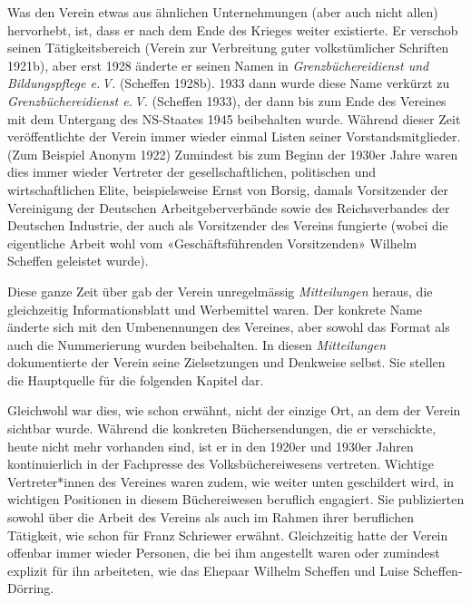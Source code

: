 \documentclass[a4paper,
fontsize=11pt,
oneside,
numbers=noperiodatend,
parskip=half-,
bibliography=totoc,
final
]{scrartcl}
\begin{document}
Was den Verein etwas aus ähnlichen Unternehmungen (aber auch nicht
allen) hervorhebt, ist, dass er nach dem Ende des Krieges weiter
existierte. Er verschob seinen Tätigkeitsbereich (Verein zur Verbreitung
guter volkstümlicher Schriften 1921b), aber erst 1928 änderte er seinen
Namen in \emph{Grenzbüchereidienst und Bildungspflege e.\,V.} (Scheffen
1928b). 1933 dann wurde diese Name verkürzt zu \emph{Grenzbüchereidienst
e.\,V.} (Scheffen 1933), der dann bis zum Ende des Vereines mit dem
Untergang des NS-Staates 1945 beibehalten wurde. Während dieser Zeit
veröffentlichte der Verein immer wieder einmal Listen seiner
Vorstandsmitglieder. (Zum Beispiel Anonym 1922) Zumindest bis zum Beginn
der 1930er Jahre waren dies immer wieder Vertreter der
gesellschaftlichen, politischen und wirtschaftlichen Elite,
beispielsweise Ernst von Borsig, damals Vorsitzender der Vereinigung der
Deutschen Arbeitgeberverbände sowie des Reichsverbandes der Deutschen
Industrie, der auch als Vorsitzender des Vereins fungierte (wobei die
eigentliche Arbeit wohl vom «Geschäftsführenden Vorsitzenden» Wilhelm
Scheffen geleistet wurde).

Diese ganze Zeit über gab der Verein unregelmässig \emph{Mitteilungen}
heraus, die gleichzeitig Informationsblatt und Werbemittel waren. Der
konkrete Name änderte sich mit den Umbenennungen des Vereines, aber
sowohl das Format als auch die Nummerierung wurden beibehalten. In
diesen \emph{Mitteilungen} dokumentierte der Verein seine Zielsetzungen
und Denkweise selbst. Sie stellen die Hauptquelle für die folgenden
Kapitel dar.

Gleichwohl war dies, wie schon erwähnt, nicht der einzige Ort, an dem
der Verein sichtbar wurde. Während die konkreten Büchersendungen, die er
verschickte, heute nicht mehr vorhanden sind, ist er in den 1920er und
1930er Jahren kontinuierlich in der Fachpresse des Volksbüchereiwesens
vertreten. Wichtige Vertreter*innen des Vereines waren zudem, wie weiter
unten geschildert wird, in wichtigen Positionen in diesem Büchereiwesen
beruflich engagiert. Sie publizierten sowohl über die Arbeit des Vereins
als auch im Rahmen ihrer beruflichen Tätigkeit, wie schon für Franz
Schriewer erwähnt. Gleichzeitig hatte der Verein offenbar immer wieder
Personen, die bei ihm angestellt waren oder zumindest explizit für ihn
arbeiteten, wie das Ehepaar Wilhelm Scheffen und Luise Scheffen-Dörring.
\end{document}

